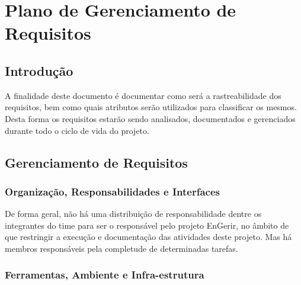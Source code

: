 
































\chapter{Plano de Gerenciamento de Requisitos}
\label{plano_de_gerenciamento_de_requisitos}

\section{Introdução}

A finalidade deste documento é documentar como será a rastreabilidade dos requisitos, bem como quais atributos serão utilizados para classificar os mesmos. Desta forma os requisitos estarão sendo analisados, documentados e gerenciados durante todo o ciclo de vida do projeto.

\section{Gerenciamento de Requisitos}

\subsection{Organização, Responsabilidades e Interfaces}

De forma geral, não há uma distribuição de responsabilidade dentre os integrantes do time para ser o responsável pelo projeto EnGerir, no âmbito de que restringir a execução e documentação das atividades deste projeto. Mas há membros responsáveis pela completude de determinadas tarefas.

\subsection{Ferramentas, Ambiente e Infra-estrutura}

